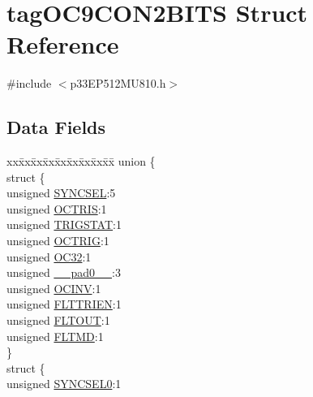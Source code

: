 \hypertarget{structtag_o_c9_c_o_n2_b_i_t_s}{}\section{tag\+O\+C9\+C\+O\+N2\+B\+I\+TS Struct Reference}
\label{structtag_o_c9_c_o_n2_b_i_t_s}


{\ttfamily \#include $<$p33\+E\+P512\+M\+U810.\+h$>$}

\subsection*{Data Fields}
\begin{DoxyCompactItemize}
\item 
\begin{tabbing}
xx\=xx\=xx\=xx\=xx\=xx\=xx\=xx\=xx\=\kill
union \{\\
\>struct \{\\
\>\>unsigned \hyperlink{structtag_o_c9_c_o_n2_b_i_t_s_a35fbbe11485c2615ed27535b62c3fa35}{SYNCSEL}:5\\
\>\>unsigned \hyperlink{structtag_o_c9_c_o_n2_b_i_t_s_ab849a74c6179282ed6b06cc047c80544}{OCTRIS}:1\\
\>\>unsigned \hyperlink{structtag_o_c9_c_o_n2_b_i_t_s_ab379549de54ac93ad4aa73686c34cb7c}{TRIGSTAT}:1\\
\>\>unsigned \hyperlink{structtag_o_c9_c_o_n2_b_i_t_s_a8d2cf9b996ef2b9079defa8950de798c}{OCTRIG}:1\\
\>\>unsigned \hyperlink{structtag_o_c9_c_o_n2_b_i_t_s_af52e127483a703e0fa84c7d4f1de0df4}{OC32}:1\\
\>\>unsigned \hyperlink{structtag_o_c9_c_o_n2_b_i_t_s_adf71f3d8410c1f1dbbc96680a92c49af}{\_\_pad0\_\_}:3\\
\>\>unsigned \hyperlink{structtag_o_c9_c_o_n2_b_i_t_s_a301004fca40c8d19d418866c92c19a06}{OCINV}:1\\
\>\>unsigned \hyperlink{structtag_o_c9_c_o_n2_b_i_t_s_ab979b75e02643aa840fb6ee50e0c30fa}{FLTTRIEN}:1\\
\>\>unsigned \hyperlink{structtag_o_c9_c_o_n2_b_i_t_s_ae466664b094d9c830e9ce20b86d7907f}{FLTOUT}:1\\
\>\>unsigned \hyperlink{structtag_o_c9_c_o_n2_b_i_t_s_a245ca3019d6c6ccbfb09f1c821146bb5}{FLTMD}:1\\
\>\} \\
\>struct \{\\
\>\>unsigned \hyperlink{structtag_o_c9_c_o_n2_b_i_t_s_a3b5df3154fde5141e6ac0156425ff8b4}{SYNCSEL0}:1\\

\end{tabbing}
\end{DoxyCompactItemize}

